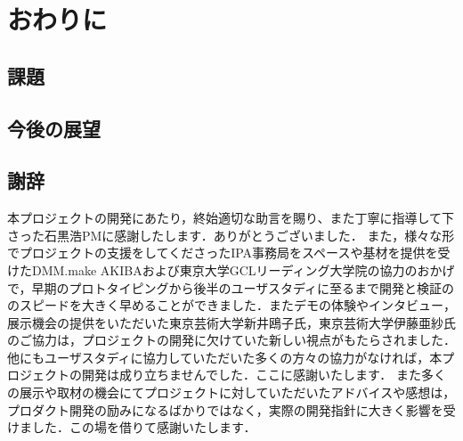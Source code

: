 \section{おわりに}
\subsection{課題}
\subsection{今後の展望}


\subsection{謝辞}
本プロジェクトの開発にあたり，終始適切な助言を賜り、また丁寧に指導して下さった石黒浩PMに感謝したします．ありがとうございました．
また，様々な形でプロジェクトの支援をしてくださったIPA事務局をスペースや基材を提供を受けたDMM.make AKIBAおよび東京大学GCLリーディング大学院の協力のおかげで，早期のプロトタイピングから後半のユーザスタディに至るまで開発と検証ののスピードを大きく早めることができました．またデモの体験やインタビュー，展示機会の提供をいただいた東京芸術大学新井鴎子氏，東京芸術大学伊藤亜紗氏のご協力は，プロジェクトの開発に欠けていた新しい視点がもたらされました．
他にもユーザスタディに協力していただいた多くの方々の協力がなければ，本プロジェクトの開発は成り立ちませんでした．ここに感謝いたします．
また多くの展示や取材の機会にてプロジェクトに対していただいたアドバイスや感想は，プロダクト開発の励みになるばかりではなく，実際の開発指針に大きく影響を受けました．この場を借りて感謝いたします．
